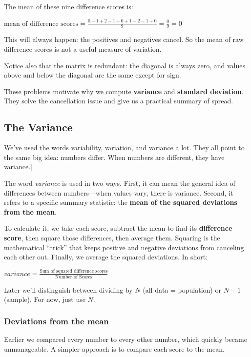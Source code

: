 \documentclass[
  letterpaper,
  DIV=11,
  numbers=noendperiod]{scrreprt}
\begin{document}
The mean of these nine difference scores is:

\(\text{mean of difference scores} = \frac{0+1+2-1+0+1-2-1+0}{9} = \frac{0}{9} = 0\)

This will always happen: the positives and negatives cancel. So the mean
of raw difference scores is not a useful measure of variation.

Notice also that the matrix is redundant: the diagonal is always zero,
and values above and below the diagonal are the same except for sign.

These problems motivate why we compute \textbf{variance} and
\textbf{standard deviation}. They solve the cancellation issue and give
us a practical summary of spread.

\subsection{The Variance}\label{the-variance}

We've used the words variability, variation, and variance a lot. They
all point to the same big idea: numbers differ. When numbers are
different, they have variance.{]}

The word \emph{variance} is used in two ways. First, it can mean the
general idea of differences between numbers---when values vary, there is
variance. Second, it refers to a specific summary statistic: the
\textbf{mean of the squared deviations from the mean}.

To calculate it, we take each score, subtract the mean to find its
\textbf{difference score}, then square those differences, then average
them. Squaring is the mathematical ``trick'' that keeps positive and
negative deviations from canceling each other out. Finally, we average
the squared deviations. In short:

\(variance = \frac{\text{Sum of squared difference scores}}{\text{Number of Scores}}\)

Later we'll distinguish between dividing by \(N\) (all data =
population) or \(N-1\) (sample). For now, just use \(N\).

\subsubsection{Deviations from the mean}\label{deviations-from-the-mean}

Earlier we compared every number to every other number, which quickly
became unmanageable. A simpler approach is to compare each score to the
mean.
\end{document}
